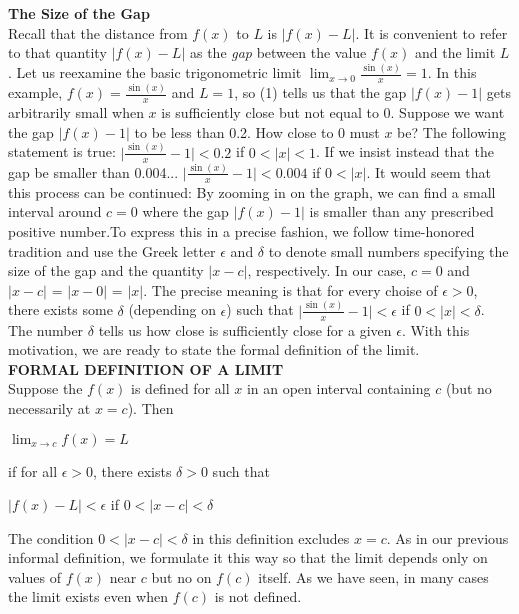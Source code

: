 \documentclass{article}
\begin{document}
\textbf{The Size of the Gap}\\
	Recall that the distance from $f(x)$ to $L$ is $\lvert f(x) - L\rvert$. It is convenient to refer to that quantity $\lvert f(x) - L\rvert$ as the \textit{gap} between the value $f(x)$ and the limit $L$. Let us reexamine the basic trigonometric limit $\lim_{x \to 0}\frac{\sin(x)}{x} = 1$. In this example, $f(x) = \frac{\sin(x)}{x}$ and $L = 1$, so (1) tells us that the gap $\lvert f(x) - 1\rvert$ gets arbitrarily small when $x$ is sufficiently close but not equal to 0. Suppose we want the gap $\lvert f(x) - 1\rvert$ to be less than 0.2. How close to 0 must $x$ be? The following statement is true: $\lvert \frac{\sin(x)}{x} - 1\rvert < 0.2$ if $0 < \lvert x\rvert < 1$. If we insist instead that the gap be smaller than 0.004... $\lvert \frac{\sin(x)}{x} - 1\rvert < 0.004$ if $0 < \lvert x\rvert$. It would seem that this process can be continued: By zooming in on the graph, we can find a small interval around $c = 0$ where the gap $\lvert f(x) - 1\rvert$ is smaller than any prescribed positive number.To express this in a precise fashion, we follow time-honored tradition and use the Greek letter $\epsilon$ and $\delta$ to denote small numbers specifying the size of the gap and the quantity $\lvert x - c\rvert$, respectively. In our case, $c = 0$ and $\lvert x - c\rvert$ = $\lvert x - 0\rvert$ = $\lvert x\rvert$. The precise meaning is that for every choise of $\epsilon > 0$, there exists some $\delta$ (depending on $\epsilon$) such that $\lvert \frac{\sin(x)}{x} - 1\rvert < \epsilon$ if $0 < \lvert x\rvert < \delta$. The number $\delta$ tells us how close is sufficiently close for a given $\epsilon$. With this motivation, we are ready to state the formal definition of the limit.\\

\textbf{FORMAL DEFINITION OF A LIMIT}\\
Suppose the $f(x)$ is defined for all $x$ in an open interval containing $c$ (but no necessarily at $x = c$). Then \begin{center}$\lim_{x \to c}f(x) = L$\end{center} if for all $\epsilon > 0$, there exists $\delta > 0$ such that \begin{center}$\lvert f(x) - L\rvert<\epsilon$ if $0<\lvert x - c\rvert<\delta$\end{center} The condition $0 < \lvert x - c\rvert < \delta$ in this definition excludes $x = c$. As in our previous informal definition, we formulate it this way so that the limit depends only on values of $f(x)$ near $c$ but no on $f(c)$ itself. As we have seen, in many cases the limit exists even when $f(c)$ is not defined.
\end{document}
